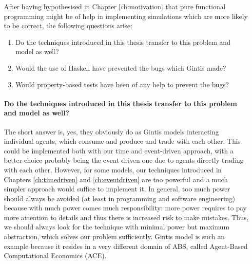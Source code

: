 After having hypothesised in Chapter \ref{ch:motivation} that pure functional programming might be of help in implementing simulations which are more likely to be correct, the following questions arise:

\begin{enumerate}
	\item Do the techniques introduced in this thesis transfer to this problem and model as well?
	\item Would the use of Haskell have prevented the bugs which Gintis made?
	\item Would property-based tests have been of any help to prevent the bugs?
\end{enumerate}

\paragraph{Do the techniques introduced in this thesis transfer to this problem and model as well?}
The short answer is, yes, they obviously do as Gintis models interacting individual agents, which consume and produce and trade with each other. This could be implemented both with our time and event-driven approach, with a better choice probably being the event-driven one due to agents directly trading with each other. However, for some models, our techniques introduced in Chapters \ref{ch:timedriven} and \ref{ch:eventdriven} are too powerful and a much simpler approach would suffice to implement it. In general, too much power should always be avoided (at least in programming and software engineering) because with much power comes much responsibility: more power requires to pay more attention to details and thus there is increased risk to make mistakes. Thus, we should always look for the technique with minimal power but maximum abstraction, which solves our problem sufficiently. Gintis model is such an example because it resides in a very different domain of ABS, called Agent-Based Computational Economics (ACE).

